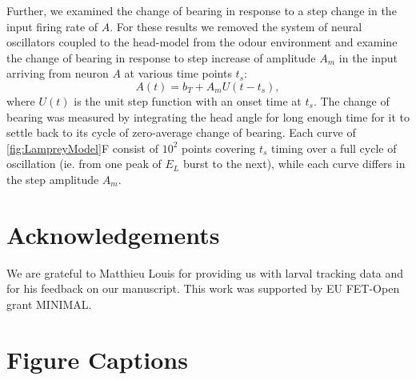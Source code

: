 \documentclass[11pt,a4paper]{article}
\begin{document}
Further, we examined the change of bearing in response to a step change in the input firing rate of $A$.
 For these results we removed the system of neural oscillators coupled to the head-model from the odour environment and examine the change of bearing in response to step increase of amplitude $A_m$ in the input arriving from neuron $A$ at various time points $t_s$:
\begin{equation}
A(t) = b_T + A_m U(t-t_s),
\end{equation}
where $U(t)$ is the unit step function with an onset time at $t_s$. The change of bearing was measured by integrating the head angle for long enough time for it to settle back to its cycle of zero-average change of bearing. Each curve of \ref{fig:LampreyModel}F consist of $10^2$ points covering $t_s$ timing over a full cycle of oscillation (ie. from one peak of $E_L$ burst to the next), while each curve differs in the step amplitude $A_m$.


\section{Acknowledgements}
We are grateful to Matthieu Louis for providing us with larval tracking data and for his feedback on our manuscript. This work was supported by EU FET-Open grant MINIMAL.

\newpage

\clearpage

\section{Figure Captions}
\end{document}
